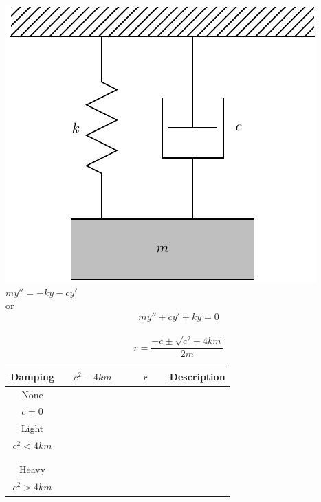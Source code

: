\begin{center}
\begin{minipage}{0.35\linewidth}
\vspace{0pt}
\begin{center}
\includegraphics[width=0.5\linewidth]{graphics/notes_08_hanging_mass}
$m y'' =  -k y - c y'$ \\
or
$$my'' + cy' + ky =  0$$ \\[2ex]

$$r = \frac{-c \pm \sqrt{c^2 - 4 km}}{2m}$$
\end{center}
\end{minipage}
\begin{minipage}{0.6\linewidth}
\vspace{0pt}
\begin{tabular}{|c|c|c|c|} \hline
Damping  & $\quad c^2 - 4km \quad$ & $\; \quad r\quad\;$ & Description \\ \hline
None & & & \\[1ex]  
$c=0$ & & & \\[1ex]   \hline
Light & & & \\[1ex]  
$c^2 < 4km$ & & & \\[1ex]   \hline
 & & & \\[1ex]  
& & & \\[1ex]   \hline
Heavy & & & \\[1ex]  
$c^2 > 4km$ & & & \\[1ex]   \hline
\end{tabular}
\end{minipage}
\end{center}

\newpage

